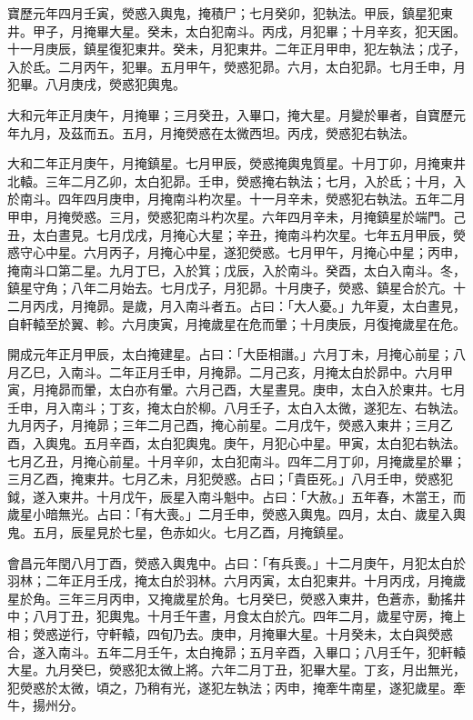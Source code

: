 \begin{pinyinscope}
 寶歷元年四月壬寅，熒惑入輿鬼，掩積尸；七月癸卯，犯執法。甲辰，鎮星犯東井。甲子，月掩畢大星。癸未，太白犯南斗。丙戌，月犯畢；十月辛亥，犯天囷。十一月庚辰，鎮星復犯東井。癸未，月犯東井。二年正月甲申，犯左執法；戊子，入於氐。二月丙午，犯畢。五月甲午，熒惑犯昴。六月，太白犯昴。七月壬申，月犯畢。八月庚戌，熒惑犯輿鬼。



 大和元年正月庚午，月掩畢；三月癸丑，入畢口，掩大星。月變於畢者，自寶歷元年九月，及茲而五。五月，月掩熒惑在太微西坦。丙戌，熒惑犯右執法。



 大和二年正月庚午，月掩鎮星。七月甲辰，熒惑掩輿鬼質星。十月丁卯，月掩東井北轅。三年二月乙卯，太白犯昴。壬申，熒惑掩右執法；七月，入於氐；十月，入於南斗。四年四月庚申，月掩南斗杓次星。十一月辛未，熒惑犯右執法。五年二月甲申，月掩熒惑。三月，熒惑犯南斗杓次星。六年四月辛未，月掩鎮星於端門。己丑，太白晝見。七月戊戌，月掩心大星；辛丑，掩南斗杓次星。七年五月甲辰，熒惑守心中星。六月丙子，月掩心中星，遂犯熒惑。七月甲午，月掩心中星；丙申，掩南斗口第二星。九月丁巳，入於箕；戊辰，入於南斗。癸酉，太白入南斗。冬，鎮星守角；八年二月始去。七月戊子，月犯昴。十月庚子，熒惑、鎮星合於亢。十二月丙戌，月掩昴。是歲，月入南斗者五。占曰：「大人憂。」九年夏，太白晝見，自軒轅至於翼、軫。六月庚寅，月掩歲星在危而暈；十月庚辰，月復掩歲星在危。



 開成元年正月甲辰，太白掩建星。占曰：「大臣相譖。」六月丁未，月掩心前星；八月乙巳，入南斗。二年正月壬申，月掩昴。二月己亥，月掩太白於昴中。六月甲寅，月掩昴而暈，太白亦有暈。六月己酉，大星晝見。庚申，太白入於東井。七月壬申，月入南斗；丁亥，掩太白於柳。八月壬子，太白入太微，遂犯左、右執法。九月丙子，月掩昴；三年二月己酉，掩心前星。二月戊午，熒惑入東井；三月乙酉，入輿鬼。五月辛酉，太白犯輿鬼。庚午，月犯心中星。甲寅，太白犯右執法。七月乙丑，月掩心前星。十月辛卯，太白犯南斗。四年二月丁卯，月掩歲星於畢；三月乙酉，掩東井。七月乙未，月犯熒惑。占曰；「貴臣死。」八月壬申，熒惑犯鉞，遂入東井。十月戊午，辰星入南斗魁中。占曰：「大赦。」五年春，木當王，而歲星小暗無光。占曰：「有大喪。」二月壬申，熒惑入輿鬼。四月，太白、歲星入輿鬼。五月，辰星見於七星，色赤如火。七月乙酉，月掩鎮星。



 會昌元年閏八月丁酉，熒惑入輿鬼中。占曰：「有兵喪。」十二月庚午，月犯太白於羽林；二年正月壬戌，掩太白於羽林。六月丙寅，太白犯東井。十月丙戌，月掩歲星於角。三年三月丙申，又掩歲星於角。七月癸巳，熒惑入東井，色蒼赤，動搖井中；八月丁丑，犯輿鬼。十月壬午晝，月食太白於亢。四年二月，歲星守房，掩上相；熒惑逆行，守軒轅，四旬乃去。庚申，月掩畢大星。十月癸未，太白與熒惑合，遂入南斗。五年二月壬午，太白掩昴；五月辛酉，入畢口；八月壬午，犯軒轅大星。九月癸巳，熒惑犯太微上將。六年二月丁丑，犯畢大星。丁亥，月出無光，犯熒惑於太微，頃之，乃稍有光，遂犯左執法；丙申，掩牽牛南星，遂犯歲星。牽牛，揚州分。




\end{pinyinscope}

